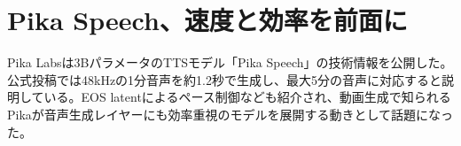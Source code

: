 \section{Pika Speech、速度と効率を前面に}
Pika Labsは3BパラメータのTTSモデル「Pika Speech」の技術情報を公開した。公式投稿では48kHzの1分音声を約1.2秒で生成し、最大5分の音声に対応すると説明している。EOS latentによるペース制御なども紹介され、動画生成で知られるPikaが音声生成レイヤーにも効率重視のモデルを展開する動きとして話題になった。
